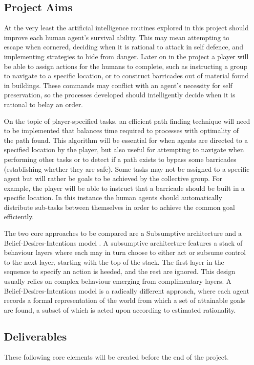 \documentclass[12pt,a4paper]{article}
\begin{document}
\subsection{Project Aims}\noindent
At the very least the artificial intelligence routines explored in this project should improve each human agent's survival ability. This may mean attempting to escape when cornered, deciding when it is rational to attack in self defence, and implementing strategies to hide from danger. Later on in the project a player will be able to assign actions for the humans to complete, such as instructing a group to navigate to a specific location, or to construct barricades out of material found in buildings. These commands may conflict with an agent's necessity for self preservation, so the processes developed should intelligently decide when it is rational to belay an order.

On the topic of player-specified tasks, an efficient path finding technique will need to be implemented that balances time required to processes with optimality of the path found. This algorithm will be essential for when agents are directed to a specified location by the player, but also useful for attempting to navigate when performing other tasks or to detect if a path exists to bypass some barricades (establishing whether they are safe). Some tasks may not be assigned to a specific agent but will rather be goals to be achieved by the collective group. For example, the player will be able to instruct that a barricade should be built in a specific location. In this instance the human agents should automatically distribute sub-tasks between themselves in order to achieve the common goal efficiently.

The two core approaches to be compared are a Subsumptive architecture \cite{brooks90} and a Belief-Desires-Intentions model \cite{rao95}. A subsumptive architecture features a stack of behaviour layers where each may in turn choose to either act or subsume control to the next layer, starting with the top of the stack. The first layer in the sequence to specify an action is heeded, and the rest are ignored. This design usually relies on complex behaviour emerging from complimentary layers. A Belief-Desires-Intentions model is a radically different approach, where each agent records a formal representation of the world from which a set of attainable goals are found, a subset of which is acted upon according to estimated rationality.

\subsection{Deliverables}\noindent
These following core elements will be created before the end of the project.
\end{document}
